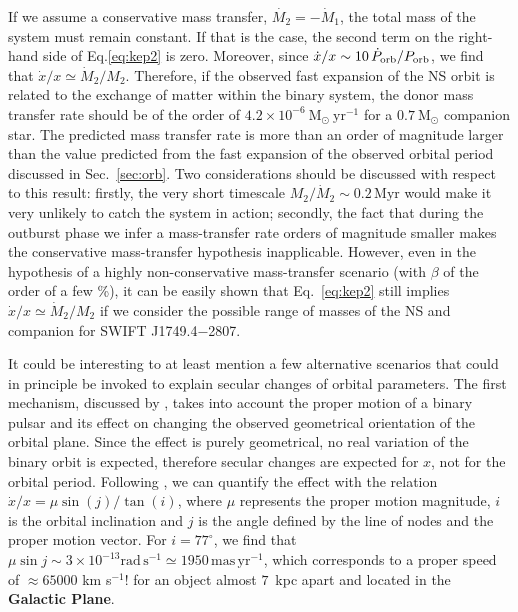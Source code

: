 \documentclass[fleqn,usenatbib]{mnras}
\newcommand{\swiftj}{SWIFT J1749.4$-$2807}
\begin{document}
If we assume a conservative mass transfer, $\dot{M_2}=-\dot{M}_1$, the total mass of the system must remain constant. If that is the case, the second term on the right-hand side of Eq.\ref{eq:kep2} is zero. Moreover, since $\dot{x}/{x} \sim 10\,\dot{P}_{\rm orb}/P_{\rm orb}$, we find that $\dot{x}/{x}\simeq \dot{M}_2/{M_2}$. Therefore, if the observed fast expansion of the NS orbit is related to the exchange of matter within the binary system, the donor mass transfer rate should be of the order of $4.2\times 10^{-6}~\text{M}_{\odot}~\text{yr}^{-1}$ for a $0.7~\text{M}_{\odot}$ companion star. The predicted mass transfer rate is more than an order of magnitude larger than the value predicted from the fast expansion of the observed orbital period discussed in Sec.~\ref{sec:orb}. Two considerations should be discussed with respect to this result: firstly, the very short timescale $M_2/\dot{M}_2\sim0.2\,\text{Myr}$ would make it very unlikely to catch the system in action; secondly, the fact that during the outburst phase we infer a mass-transfer rate orders of magnitude smaller makes the conservative mass-transfer hypothesis inapplicable. However, even in the hypothesis of a highly non-conservative mass-transfer scenario (with $\beta$ of the order of a few \%), it can be easily shown that Eq.~\ref{eq:kep2} still implies $\dot{x}/{x}\simeq \dot{M}_2/{M_2}$ if we consider the possible range of masses of the NS and companion for \swiftj{}. 

It could be interesting to at least mention a few alternative scenarios that could in principle be invoked to explain secular changes of orbital parameters. The first mechanism, discussed by \citet{Kopeikin:1996wy}, takes into account the proper motion of a binary pulsar and its effect on changing the observed geometrical orientation of the orbital plane. Since the effect is purely geometrical, no real variation of the binary orbit is expected, therefore secular changes are expected for $x$, not for the orbital period. Following \citet{Arzoumanian:1996up}, we can quantify the effect with the relation $\dot{x}/x=\mu \sin{(j)}/\tan{(i)}$, where $\mu$ represents the proper motion magnitude, $i$ is the orbital inclination and $j$ is the angle defined by the line of nodes and the proper motion vector. For $i=77^{\circ}$, we find that $\mu \sin j\sim 3\times 10^{-13} \text{rad}\, \text{s}^{-1}\simeq 1950\,\text{mas}\, \text{yr}^{-1}$, which corresponds to a proper speed of $\approx 65000$ km s$^{-1}$! for an object almost $7$~kpc apart and located in the \textbf{Galactic Plane}. 
\end{document}
